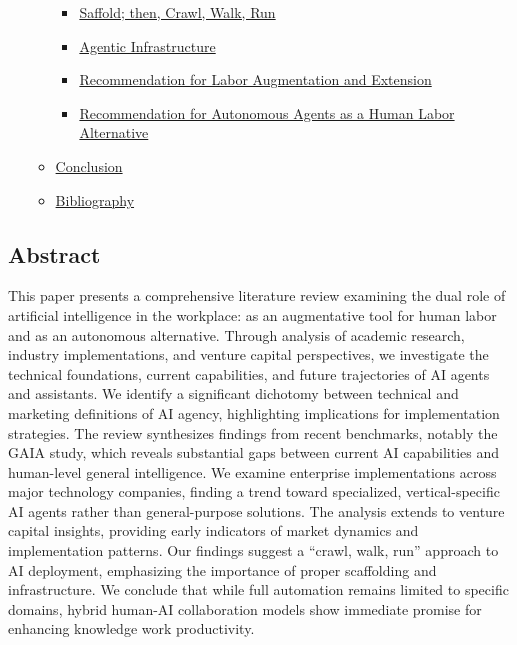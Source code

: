 \documentclass[
]{article}
\providecommand{\tightlist}{%
  \setlength{\itemsep}{0pt}\setlength{\parskip}{0pt}}
\begin{document}
\begin{itemize}
\begin{itemize}
    \begin{itemize}
    \tightlist
    \item
      \hyperref[saffold-then-crawl-walk-run]{Saffold; then, Crawl, Walk,
      Run}
    \item
      \hyperref[agentic-infrastructure]{Agentic Infrastructure}
    \item
      \hyperref[recommendation-for-labor-augmentation-and-extension]{Recommendation
      for Labor Augmentation and Extension}
    \item
      \hyperref[recommendation-for-autonomous-agents-as-a-human-labor-alternative]{Recommendation
      for Autonomous Agents as a Human Labor Alternative}
    \end{itemize}
  \item
    \hyperref[conclusion]{Conclusion}
  \item
    \hyperref[bibliography]{Bibliography}
  \end{itemize}
\end{itemize}

\subsection{Abstract}\label{abstract}

This paper presents a comprehensive literature review examining the dual
role of artificial intelligence in the workplace: as an augmentative
tool for human labor and as an autonomous alternative. Through analysis
of academic research, industry implementations, and venture capital
perspectives, we investigate the technical foundations, current
capabilities, and future trajectories of AI agents and assistants. We
identify a significant dichotomy between technical and marketing
definitions of AI agency, highlighting implications for implementation
strategies. The review synthesizes findings from recent benchmarks,
notably the GAIA study, which reveals substantial gaps between current
AI capabilities and human-level general intelligence. We examine
enterprise implementations across major technology companies, finding a
trend toward specialized, vertical-specific AI agents rather than
general-purpose solutions. The analysis extends to venture capital
insights, providing early indicators of market dynamics and
implementation patterns. Our findings suggest a ``crawl, walk, run''
approach to AI deployment, emphasizing the importance of proper
scaffolding and infrastructure. We conclude that while full automation
remains limited to specific domains, hybrid human-AI collaboration
models show immediate promise for enhancing knowledge work productivity.
\end{document}
